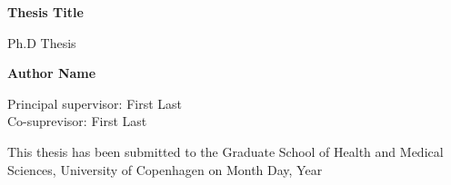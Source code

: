 
    \begin{center}
        \vspace*{1cm}
            
        \Huge
        \textbf{Thesis Title}
            
        \vspace{0.5cm}
        \LARGE
        Ph.D Thesis
    
            
        \vspace{1.5cm}
            
        \textbf{Author Name}
        
        \vspace{1.5cm}
        Principal supervisor: First Last
        \\
        Co-suprevisor: First Last       
        \vfill
    
            
        This thesis has been submitted to the Graduate School of Health and Medical Sciences, University of Copenhagen on Month Day, Year
            
    \end{center}
